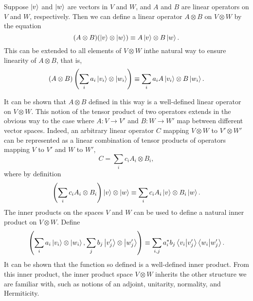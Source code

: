 Suppose $\ket{v}$ and $\ket{w}$ are vectors in $V$ and $W$, and $A$ and $B$ are
linear operators on $V$ and $W$, respectively. Then we can define a linear
operator $A \otimes B$ on $V \otimes W$ by the equation \begin{equation*}
  (A \otimes B)(\ket{v} \otimes \ket{w}) \equiv A\ket{v} \otimes B\ket{w}.
\end{equation*}
This can be extended to all elements of $V \otimes W$ inthe natural way to
ensure linearity of $A \otimes B$, that is, \begin{equation*}
  (A \otimes B)\left(\sum_i a_i\ket{v_i} \otimes \ket{w_i}\right)
    \equiv \sum_i a_iA\ket{v_i} \otimes B\ket{w_i}.
\end{equation*}

It can be shown that $A \otimes B$ defined in this way is a well-defined linear
operator on $V \otimes W$. This notion of the tensor product of two operators
extends in the obvious way to the case where $A: V \rightarrow V'$ and $B: W
\rightarrow W'$ map between different vector spaces. Indeed, an arbitrary
linear operator $C$ mapping $V \otimes W$ to $V' \otimes W'$ can be represented
as a linear combination of tensor products of operators mapping $V$ to $V'$ and
$W$ to $W'$, \begin{equation*}
  C = \sum_i c_iA_i \otimes B_i,
\end{equation*}
where by definition \begin{equation*}
  \left(\sum_i c_iA_i \otimes B_i\right) \ket{v} \otimes \ket{w}
    \equiv \sum_i c_iA_i\ket{v} \otimes B_i\ket{w}.
\end{equation*}
The inner products on the spaces $V$ and $W$ can be used to define a natural
inner product on $V \otimes W$. Define \begin{equation*}
  \left(\sum_i a_i\ket{v_i} \otimes \ket{w_i}, \sum_j b_j\ket{v'_j} \otimes
    \ket{w'_j}\right) \equiv \sum_{i,j} a_i^*b_j \braket{v_i}{v'_j}
    \braket{w_i}{w'_j}.
\end{equation*}
It can be shown that the function so defined is a well-defined inner product.
From this inner product, the inner product space $V \otimes W$ inherits the
other structure we are familiar with, such as notions of an adjoint, unitarity,
normality, and Hermiticity.

